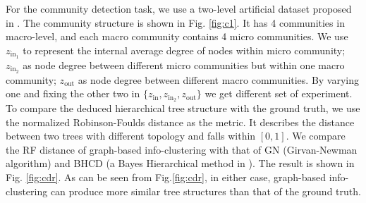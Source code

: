 \documentclass{article}
\begin{document}
For the community detection task, we use a two-level artificial dataset proposed in \cite{RN22}. 
The community structure is shown in Fig. \ref{fig:c1}. It has 4 communities in macro-level, and each macro community contains 4 micro communities. We use $z_{\mathrm{in}_1}$ to represent the internal average degree of nodes within micro community; $z_{\mathrm{in}_2}$ as node degree between different micro communities but within one macro community; $z_{\mathrm{out}}$ as node degree between different macro communities. By varying one and fixing the other two in $\{z_{\mathrm{in}} , z_{\mathrm{in}_2}, z_{\mathrm{out}} \}$ we get different set of experiment. To compare the deduced hierarchical tree structure with the ground truth, we use the normalized Robinson-Foulds distance as the metric. It describes the distance between two trees with different topology and falls within $[0,1]$. We compare the RF distance of graph-based info-clustering with that of GN (Girvan-Newman algorithm) and BHCD (a Bayes Hierarchical method in \cite{RN23}). The result is shown in Fig. \ref{fig:cdr}. As can be seen from Fig.\ref{fig:cdr}, in either case, graph-based info-clustering can produce more similar tree structures than that of the ground truth.
\end{document}
